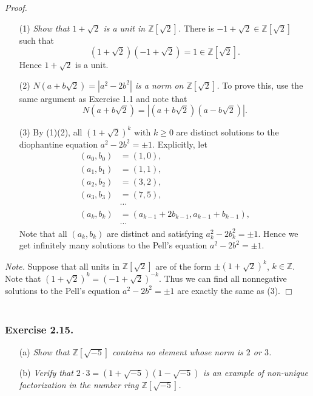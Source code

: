 \documentclass{article}
\begin{document}
\emph{Proof.}
\begin{enumerate}
\item[(1)]
\emph{Show that $1+\sqrt{2}$ is a unit in $\mathbb{Z}[\sqrt{2}]$.}
There is $-1+\sqrt{2} \in \mathbb{Z}[\sqrt{2}]$
such that $$(1+\sqrt{2})(-1+\sqrt{2}) = 1 \in \mathbb{Z}[\sqrt{2}].$$
Hence $1+\sqrt{2}$ is a unit.
\item[(2)]
\emph{$N(a+b\sqrt{2}) = |a^2 - 2b^2|$ is a norm on $\mathbb{Z}[\sqrt{2}]$.}
To prove this, use the same argument as Exercise 1.1 and note that
$$N(a+b\sqrt{2}) = |(a+b\sqrt{2})(a-b\sqrt{2})|.$$
\item[(3)]
By (1)(2),
all $(1+\sqrt{2})^k$ with $k \geq 0$
are distinct solutions to the diophantine equation $a^2 - 2b^2 = \pm 1$.
Explicitly, let
\begin{align*}
(a_0,b_0) &= (1,0), \\
(a_1,b_1) &= (1,1), \\
(a_2,b_2) &= (3,2), \\
(a_3,b_3) &= (7,5), \\
&\cdots \\
(a_k,b_k) &= (a_{k-1}+2b_{k-1},a_{k-1}+b_{k-1}), \\
&\cdots
\end{align*}
Note that all $(a_k,b_k)$ are distinct and satisfying $a_k^2 - 2b_k^2 = \pm 1$.
Hence we get infinitely many solutions to the Pell's equation $a^2 - 2b^2 = \pm 1$.
\end{enumerate}

\emph{Note.}
Suppose that all units in $\mathbb{Z}[\sqrt{2}]$
are of the form $\pm(1+\sqrt{2})^k$, $k \in \mathbb{Z}$.
Note that $(1+\sqrt{2})^k = (-1+\sqrt{2})^{-k}$.
Thus we can find all nonnegative solutions to the Pell's equation $a^2 - 2b^2 = \pm 1$
are exactly the same as (3).
$\Box$ \\\\






\subsubsection*{Exercise 2.15.}
\begin{enumerate}
\item[(a)]
\emph{Show that $\mathbb{Z}[\sqrt{-5}]$ contains no element whose norm is $2$ or $3$.}
\item[(b)]
\emph{Verify that $2 \cdot 3 = (1+\sqrt{-5})(1-\sqrt{-5})$ is an example
of non-unique factorization in the number ring $\mathbb{Z}[\sqrt{-5}]$.} \\
\end{enumerate}
\end{document}
